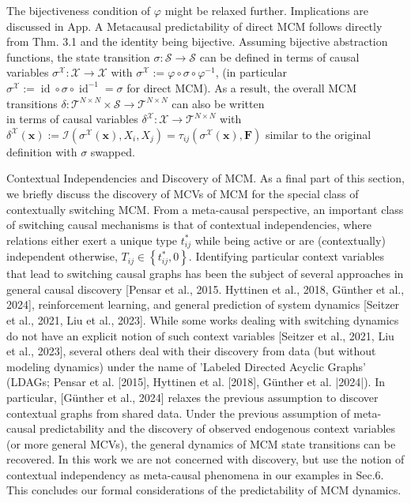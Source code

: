 \documentclass[10pt]{article}
\begin{document}
The bijectiveness condition of $\varphi$ might be relaxed further. Implications are discussed in App. A Metacausal predictability of direct MCM follows directly from Thm. 3.1 and the identity being bijective. Assuming bijective abstraction functions, the state transition $\sigma: \mathcal{S} \rightarrow \mathcal{S}$ can be defined in terms of causal variables $\sigma^{\mathcal{X}}: \mathcal{X} \rightarrow \mathcal{X}$ with $\sigma^{\mathcal{X}}:=\varphi \circ \sigma \circ \varphi^{-1}$, (in particular $\sigma^{\mathcal{X}}:=\operatorname{id} \circ \sigma \circ \operatorname{id}^{-1}=\sigma$ for direct MCM). As a result, the overall MCM transitions $\delta: \mathcal{T}^{N \times N} \times \mathcal{S} \rightarrow \mathcal{T}^{N \times N}$ can also be written\\
in terms of causal variables $\delta^{\mathcal{X}}: \mathcal{X} \rightarrow \mathcal{T}^{N \times N}$ with $\delta^{\mathcal{X}}(\mathbf{x}):=\mathcal{I}\left(\sigma^{\mathcal{X}}(\mathbf{x}), X_{i}, X_{j}\right)=\tau_{i j}\left(\sigma^{\mathcal{X}}(\mathbf{x}), \mathbf{F}\right)$ similar to the original definition with $\sigma$ swapped.

Contextual Independencies and Discovery of MCM. As a final part of this section, we briefly discuss the discovery of MCVs of MCM for the special class of contextually switching MCM. From a meta-causal perspective, an important class of switching causal mechanisms is that of contextual independencies, where relations either exert a unique type $t_{i j}^{*}$ while being active or are (contextually) independent otherwise, $T_{i j} \in\left\{t_{i j}^{*}, 0\right\}$. Identifying particular context variables that lead to switching causal graphs has been the subject of several approaches in general causal discovery [Pensar et al., 2015. Hyttinen et al., 2018, Günther et al., 2024], reinforcement learning, and general prediction of system dynamics [Seitzer et al., 2021, Liu et al., 2023]. While some works dealing with switching dynamics do not have an explicit notion of such context variables [Seitzer et al., 2021, Liu et al., 2023], several others deal with their discovery from data (but without modeling dynamics) under the name of 'Labeled Directed Acyclic Graphs' (LDAGs; Pensar et al. [2015], Hyttinen et al. [2018], Günther et al. |2024|). In particular, [Günther et al., 2024] relaxes the previous assumption to discover contextual graphs from shared data. Under the previous assumption of meta-causal predictability and the discovery of observed endogenous context variables (or more general MCVs), the general dynamics of MCM state transitions can be recovered. In this work we are not concerned with discovery, but use the notion of contextual independency as meta-causal phenomena in our examples in Sec.6. This concludes our formal considerations of the predictability of MCM dynamics.
\end{document}
